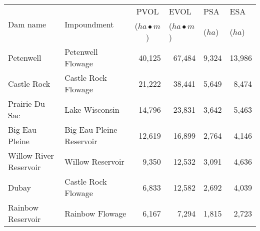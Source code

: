 \begin{table}[h!]
	\caption[Geometries of Wisconsin River Basin reservoirs]{Geometries of Wisconsin River Basin reservoirs, where PVOL is principal volume, EVOL is emergency volume, PSA is principal surface area, and ESA is emergency surface area.}
	\centering
	\begin{table}[h]
		\begin{tabular}{llrrrr}
			\multirow{2}{*}{Dam  name} & \multirow{2}{*}{Impoundment}  & \multicolumn{1}{c}{PVOL}             & \multicolumn{1}{l}{EVOL}             & \multicolumn{1}{l}{PSA}    & \multicolumn{1}{l}{ESA}    \\
                                       &                               & \multicolumn{1}{c}{($ha \bullet m$)} & \multicolumn{1}{l}{($ha \bullet m$)} & \multicolumn{1}{l}{($ha$)} & \multicolumn{1}{l}{($ha$)} \\
\hline \hline
			Petenwell                  & Petenwell Flowage             & 40,125                               & 67,484                               & 9,324                      & 13,986                     \\
			Castle Rock                & Castle Rock Flowage           & 21,222                               & 38,441                               & 5,649                      & 8,474                      \\
			Prairie Du Sac             & Lake Wisconsin                & 14,796                               & 23,831                               & 3,642                      & 5,463                      \\
			Big Eau Pleine             & Big Eau Pleine Reservoir      & 12,619                               & 16,899                               & 2,764                      & 4,146                      \\
			Willow River Reservoir     & Willow Reservoir              & 9,350                                & 12,532                               & 3,091                      & 4,636                      \\
			Dubay                      & Castle Rock Flowage           & 6,833                                & 12,582                               & 2,692                      & 4,039                      \\
			Rainbow Reservoir          & Rainbow Flowage               & 6,167                                & 7,294                                & 1,815                      & 2,723                      \\

\end{tabular}
\end{table}
\end{table}
